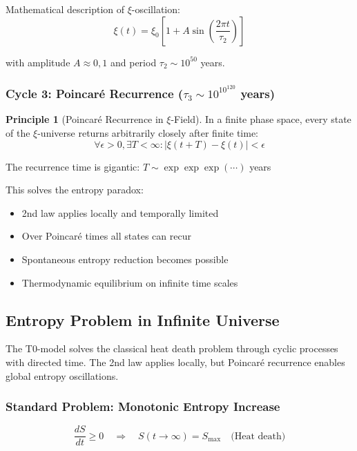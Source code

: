 \documentclass[12pt,a4paper]{article}
\theoremstyle{definition}
\newtheorem{principle}{Principle}
\begin{document}
	Mathematical description of $\xi$-oscillation:
	\begin{equation}
		\xi(t) = \xi_0 \left[1 + A \sin\left(\frac{2\pi t}{\tau_2}\right)\right]
	\end{equation}
	
	with amplitude $A \approx 0{,}1$ and period $\tau_2 \sim 10^{50}$ years.
	
	\subsubsection{Cycle 3: Poincaré Recurrence ($\tau_3 \sim 10^{10^{120}}$ years)}
	
	\begin{principle}[Poincaré Recurrence in $\xi$-Field]
		In a finite phase space, every state of the $\xi$-universe returns arbitrarily closely after finite time:
		\begin{equation}
			\forall \epsilon > 0, \exists T < \infty: |\xi(t+T) - \xi(t)| < \epsilon
		\end{equation}
		
		The recurrence time is gigantic: $T \sim \exp\exp\exp(\cdots)$ years
	\end{principle}
	
	This solves the entropy paradox:
	\begin{itemize}
		\item 2nd law applies locally and temporally limited
		\item Over Poincaré times all states can recur
		\item Spontaneous entropy reduction becomes possible
		\item Thermodynamic equilibrium on infinite time scales
	\end{itemize}
	
	\subsection{Entropy Problem in Infinite Universe}
	
	\begin{revolutionary}
		The T0-model solves the classical heat death problem through cyclic processes with directed time. The 2nd law applies locally, but Poincaré recurrence enables global entropy oscillations.
	\end{revolutionary}
	
	\subsubsection{Standard Problem: Monotonic Entropy Increase}
	\begin{equation}
		\frac{dS}{dt} \geq 0 \quad \Rightarrow \quad S(t \to \infty) = S_{\text{max}} \quad \text{(Heat death)}
	\end{equation}
	
\end{document}
